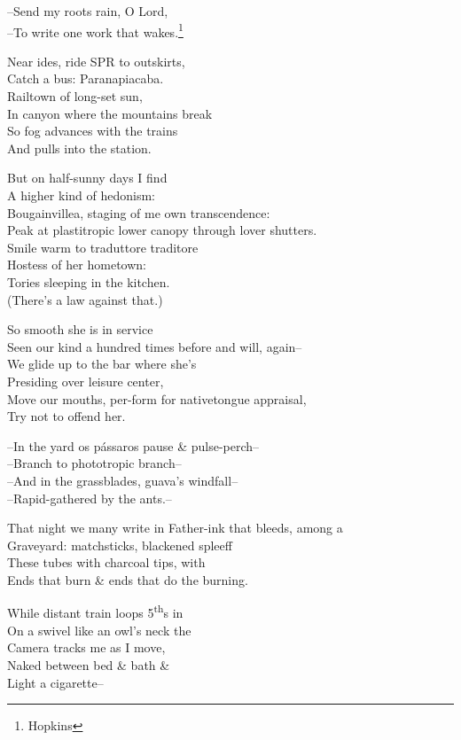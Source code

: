 --Send my roots rain, O Lord, \\
--To write one work that wakes.\footnote{Hopkins}

Near ides, ride SPR to outskirts, \\
Catch a bus: Paranapiacaba. \\
Railtown of long-set sun, \\
In canyon where the mountains break \\
So fog advances with the trains \\
And pulls into the station.

But on half-sunny days I find \\
A higher kind of hedonism: \\
Bougainvillea, staging of me own transcendence: \\
Peak at plastitropic lower canopy through lover shutters. \\
Smile warm to traduttore traditore \\
Hostess of her hometown: \\
Tories sleeping in the kitchen. \\
(There's a law against that.)

So smooth she is in service \\
Seen our kind a hundred times before and will, again-- \\
We glide up to the bar where she's \\
Presiding over leisure center, \\ 
Move our mouths, per-form for nativetongue appraisal, \\
Try not to offend her.

--In the yard os pássaros pause \& pulse-perch-- \\
--Branch to phototropic branch-- \\
--And in the grassblades, guava's windfall-- \\
--Rapid-gathered by the ants.--

That night we many write in Father-ink that bleeds, among a \\
Graveyard: matchsticks, blackened spleeff \\
These tubes with charcoal tips, with \\
Ends that burn \& ends that do the burning.

While distant train loops 5\textsuperscript{th}s in \; \\
On a swivel like an owl's neck the \\
Camera tracks me as I move, \\
Naked between bed \& bath \& \\
Light a cigarette--

